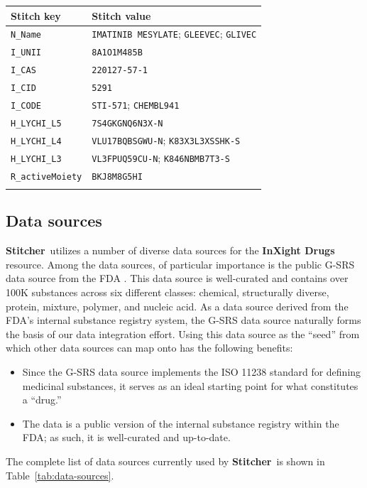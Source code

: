 \documentclass{bioinfo}
\newcommand\st{\textbf{Stitcher}}
\newcommand\ix{\textbf{InXight Drugs}}
\begin{document}
\begin{table}[thb]
{\begin{tabular}{@{}ll@{}}\toprule Stitch key &
Stitch value\\\midrule
\texttt{N\_Name} & \texttt{IMATINIB MESYLATE}; \texttt{GLEEVEC}; \texttt{GLIVEC}\\
\texttt{I\_UNII} & \texttt{8A1O1M485B}\\
\texttt{I\_CAS} & \texttt{220127-57-1}\\
\texttt{I\_CID} & \texttt{5291}\\
\texttt{I\_CODE} & \texttt{STI-571}; \texttt{CHEMBL941}\\
\texttt{H\_LYCHI\_L5} & \texttt{7S4GKGNQ6N3X-N}\\
\texttt{H\_LYCHI\_L4} & \texttt{VLU17BQBSGWU-N}; \texttt{K83X3L3XSSHK-S}\\
\texttt{H\_LYCHI\_L3} & \texttt{VL3FPUQ59CU-N}; \texttt{K846NBMB7T3-S}\\
\texttt{R\_activeMoiety} & \texttt{BKJ8M8G5HI}\\\botrule
\end{tabular}}{}
\end{table}

\subsection{Data sources}
\st\ utilizes a number of diverse data sources for the \ix{} resource.
Among the data sources, of particular importance is the public G-SRS
data source from the FDA \citep{GSRSData}. This data source is
well-curated and contains over 100K substances across six different
classes: chemical, structurally diverse, protein, mixture, polymer,
and nucleic acid. As a data source derived from the FDA's internal
substance registry system, the G-SRS data source naturally forms the
basis of our data integration
effort. Using this data source as
the ``seed'' from which other data
sources can map onto has the following benefits:
\begin{itemize}
\item Since the G-SRS data source implements the ISO 11238
standard \citep{ISO11238} for defining medicinal substances, it serves
as an ideal starting point for what constitutes a ``drug.''
\item The data is a public version of the internal substance registry
within the FDA; as such, it is well-curated and up-to-date.
\end{itemize}
The complete list of data sources currently used by \st\ is shown in
Table~\ref{tab:data-sources}. 
\end{document}

